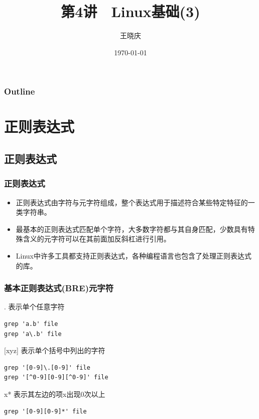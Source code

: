 \documentclass[xcolor=svgnames,presentation]{beamer}
\title{第4讲　Linux基础(3)}
\author{王晓庆}
\date{\today}
\institute{wangxiaoqing@outlook.com}
\begin{document}
\maketitle

\begin{frame}
\frametitle{Outline}
\setcounter{tocdepth}{1}
\tableofcontents
\end{frame}

\section{正则表达式}
\label{sec-1}
\subsection{正则表达式}
\label{sec-1-1}
\begin{frame}
\frametitle{正则表达式}
\label{sec-1-1-1}
\begin{itemize}

\item 正则表达式由字符与元字符组成，整个表达式用于描述符合某些特定特征的一类字符串。
\label{sec-1-1-1-1}%

\item 最基本的正则表达式匹配单个字符，大多数字符都与其自身匹配，少数具有特殊含义的元字符可以在其前面加反斜杠进行引用。
\label{sec-1-1-1-2}%

\item Linux中许多工具都支持正则表达式，各种编程语言也包含了处理正则表达式的库。
\label{sec-1-1-1-3}%
\end{itemize} %
\end{frame}
\begin{frame}[fragile]
\frametitle{基本正则表达式(BRE)元字符}
\label{sec-1-1-2}
\begin{exampleblock}{. 表示单个任意字符}
\label{sec-1-1-2-1}


\begin{verbatim}
grep 'a.b' file
grep 'a\.b' file
\end{verbatim}
\end{exampleblock}
\begin{block}{[xyz] 表示单个括号中列出的字符}
\label{sec-1-1-2-2}


\begin{verbatim}
grep '[0-9]\.[0-9]' file
grep '[^0-9][0-9][^0-9]' file
\end{verbatim}
\end{block}
\begin{exampleblock}{x* 表示其左边的项x出现0次以上}
\label{sec-1-1-2-3}


\begin{verbatim}
grep '[0-9][0-9]*' file
\end{verbatim}
\end{exampleblock}
\end{frame}
\end{document}
